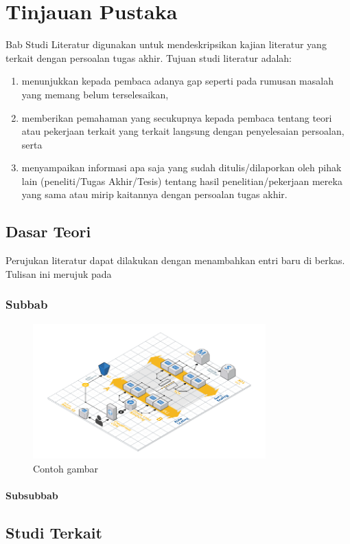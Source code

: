 \chapter{Tinjauan Pustaka}

Bab Studi Literatur digunakan untuk mendeskripsikan kajian literatur yang terkait dengan persoalan tugas akhir. Tujuan studi literatur adalah:

\begin{enumerate}
    \item menunjukkan kepada pembaca adanya gap seperti pada rumusan masalah yang memang belum terselesaikan,
    \item memberikan pemahaman yang secukupnya kepada pembaca tentang teori atau pekerjaan terkait yang terkait langsung dengan penyelesaian persoalan, serta
    \item menyampaikan informasi apa saja yang sudah ditulis/dilaporkan oleh pihak lain (peneliti/Tugas Akhir/Tesis) tentang hasil penelitian/pekerjaan mereka yang sama atau mirip kaitannya dengan persoalan tugas akhir.
\end{enumerate}

\blindtext

\blindtext

\section{Dasar Teori}
Perujukan literatur dapat dilakukan dengan menambahkan entri baru di berkas. Tulisan ini merujuk pada %

    \subsection{Subbab}

    \blindtext

    \begin{figure}[h]
        \centering
        \includegraphics[width=0.8\textwidth]{resources/chapter-2-infrastructure-diagram.png}
        \caption{Contoh gambar}
    \end{figure}

    \subsubsection{Subsubbab}

    \blindtext

\section{Studi Terkait}
\blindtext
